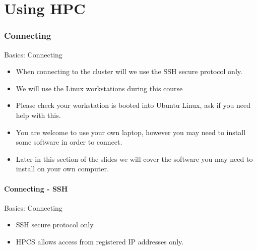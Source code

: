 \part{Using HPC}
\begin{frame}
\partpage
\end{frame}
\section{Connecting}
\begin{frame}{Basics: Connecting}
\begin{itemize}
\item When connecting to the cluster will we use the SSH secure protocol only.\hfill\\
\item{We will use the Linux workstations during this course}
\item{Please check your workstation is booted into Ubuntu Linux, ask if you need help with this.}
\item{You are welcome to use your own laptop, however you may need to install some software in order to connect.}
\item{Later in this section of the slides we will cover the software you may need to install on your own computer.}
\end{itemize}
\end{frame}

\subsection{Connecting - SSH}
\begin{frame}{Basics: Connecting}
\begin{itemize}
\item SSH secure protocol only.\hfill\\
\item<3-> HPCS allows access from registered IP addresses only.\hfill\\
\hfill\\
\end{itemize}
\end{frame}

